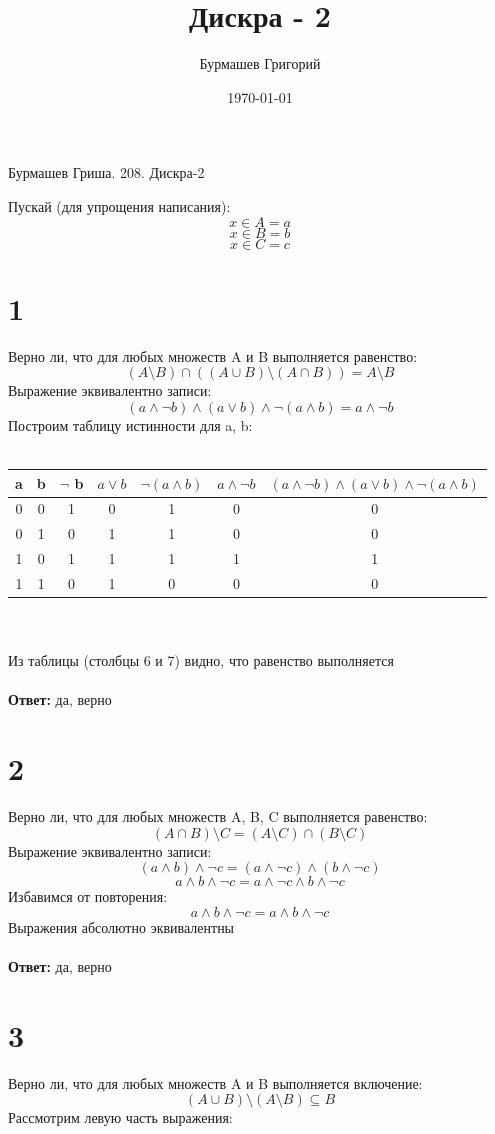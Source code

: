 \documentclass[a4paper,12pt]{article}
\author{Бурмашев Григорий}
\title{Дискра - 2}
\date{\today}
\begin{document}
\begin{center}
Бурмашев Гриша. 208. Дискра-2
\end{center}
Пускай (для упрощения написания):
\[
x \in A = a\]
\[
x \in B = b
\]
\[
x \in C = c
\]
\section*{1}
Верно ли,  что для любых множеств A и B выполняется равенство:\\
\[
(A \setminus B) \cap ((A\cup B) \setminus (A \cap B)) = A \setminus B
\]
Выражение эквивалентно записи:
\[
(a \wedge \neg b) \wedge (a \vee b)\wedge \neg ( a \wedge b) = a \wedge \neg b
\]
Построим таблицу истинности для a, b:\\\\
\begin{tabular}{|c|c|c|c|c|c|c|}
\hline
 a&  b& $\neg$ b & $a \vee b$ & $\neg(a\wedge b) $& $a \wedge \neg b$ & $(a \wedge \neg b) \wedge (a \vee b)\wedge \neg ( a \wedge b)$\\
\hline
 0& 0 &1  &  0& 1 &  0 & 0\\
\hline
 0& 1 & 0 &  1& 1 &  0 & 0 \\
\hline
1 & 0 &1  & 1 &  1& 1 & 1\\
\hline
1 &1  & 0 & 1 &  0&  0 & 0 \\
\hline
\end{tabular}\\\\
Из таблицы (столбцы 6 и 7) видно, что равенство выполняется\\\\
\textbf{Ответ:} да, верно
\section*{2}
Верно ли,  что для любых множеств A, B, C выполняется равенство:\\
\[
(A \cap B) \setminus C = (A \setminus C) \cap (B \setminus C)
\]
Выражение эквивалентно записи:
\[
(a \wedge b) \wedge \neg c = (a \wedge \neg c) \wedge (b \wedge \neg c)
\]
\[
a \wedge b \wedge \neg c = a \wedge \neg c \wedge b \wedge \neg c
\]
Избавимся от повторения:
\[
a \wedge b \wedge \neg c = a \wedge b \wedge \neg c
\]
Выражения абсолютно эквивалентны\\\\
\textbf{Ответ:} да, верно
\section*{3}
Верно ли, что для любых множеств A и B выполняется включение:
\[
(A \cup B) \setminus (A \setminus B) \subseteq B
\]
Рассмотрим левую часть выражения:
\end{document}
